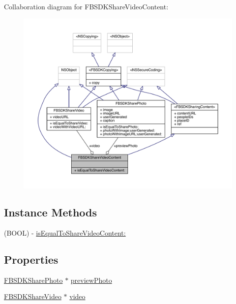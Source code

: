 Collaboration diagram for F\-B\-S\-D\-K\-Share\-Video\-Content\-:
\nopagebreak
\begin{figure}[H]
\begin{center}
\leavevmode
\includegraphics[width=350pt]{interface_f_b_s_d_k_share_video_content__coll__graph}
\end{center}
\end{figure}
\subsection*{Instance Methods}
\begin{DoxyCompactItemize}
\item 
(B\-O\-O\-L) -\/ \hyperlink{interface_f_b_s_d_k_share_video_content_a85be057c7487e289753bc586dffdb399}{is\-Equal\-To\-Share\-Video\-Content\-:}
\end{DoxyCompactItemize}
\subsection*{Properties}
\begin{DoxyCompactItemize}
\item 
\hyperlink{interface_f_b_s_d_k_share_photo}{F\-B\-S\-D\-K\-Share\-Photo} $\ast$ \hyperlink{interface_f_b_s_d_k_share_video_content_a3a4422e8ca98246301cd55ecf6689e8b}{preview\-Photo}
\item 
\hyperlink{interface_f_b_s_d_k_share_video}{F\-B\-S\-D\-K\-Share\-Video} $\ast$ \hyperlink{interface_f_b_s_d_k_share_video_content_a7808add937d3fe59f3589e9e48d04612}{video}
\end{DoxyCompactItemize}


